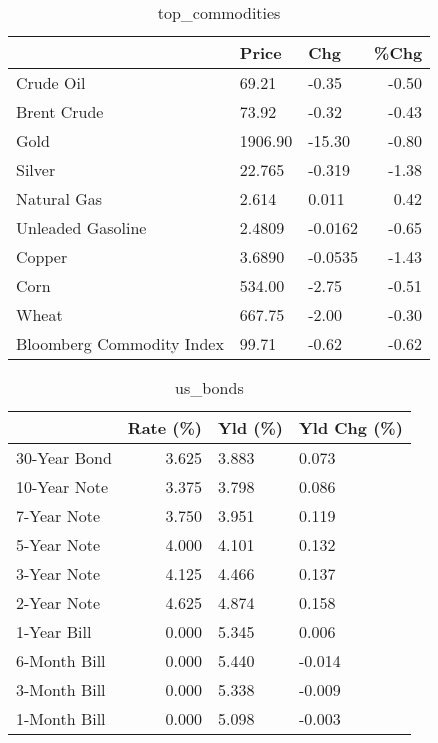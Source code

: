 \documentclass{article}%
\begin{document}
\begin{table}[htbp]%
\caption{top\_commodities}%
\centering%
\begin{adjustbox}{width=1\textwidth}%
\begin{tabular}{lllr}
\toprule
                          &   Price &     Chg &  \%Chg \\
\midrule
               Crude Oil  &   69.21 &   -0.35 & -0.50 \\
             Brent Crude  &   73.92 &   -0.32 & -0.43 \\
                    Gold  & 1906.90 &  -15.30 & -0.80 \\
                  Silver  &  22.765 &  -0.319 & -1.38 \\
             Natural Gas  &   2.614 &   0.011 &  0.42 \\
       Unleaded Gasoline  &  2.4809 & -0.0162 & -0.65 \\
                  Copper  &  3.6890 & -0.0535 & -1.43 \\
                    Corn  &  534.00 &   -2.75 & -0.51 \\
                   Wheat  &  667.75 &   -2.00 & -0.30 \\
Bloomberg Commodity Index &   99.71 &   -0.62 & -0.62 \\
\bottomrule
\end{tabular}
%
\end{adjustbox}%
\end{table}

%


\begin{table}[htbp]%
\caption{us\_bonds}%
\centering%
\begin{adjustbox}{width=1\textwidth}%
\begin{tabular}{lrll}
\toprule
             &  Rate (\%) & Yld (\%) & Yld Chg (\%) \\
\midrule
30-Year Bond &     3.625 &   3.883 &       0.073 \\
10-Year Note &     3.375 &   3.798 &       0.086 \\
 7-Year Note &     3.750 &   3.951 &       0.119 \\
 5-Year Note &     4.000 &   4.101 &       0.132 \\
 3-Year Note &     4.125 &   4.466 &       0.137 \\
 2-Year Note &     4.625 &   4.874 &       0.158 \\
 1-Year Bill &     0.000 &   5.345 &       0.006 \\
6-Month Bill &     0.000 &   5.440 &      -0.014 \\
3-Month Bill &     0.000 &   5.338 &      -0.009 \\
1-Month Bill &     0.000 &   5.098 &      -0.003 \\
\bottomrule
\end{tabular}
%
\end{adjustbox}%
\end{table}
\end{document}
